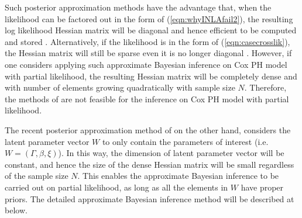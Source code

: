\documentclass[ba]{imsart}
\begin{document}
Such posterior approximation methods have the advantage that, when the likelihood can be factored out in the form of (\ref{eqn:whyINLAfail2}), the resulting log likelihood Hessian matrix will be diagonal and hence efficient to be computed and stored \citep{inla}. Alternatively, if the likelihood is in the form of (\ref{eqn:casecrosslik}), the Hessian matrix will still be sparse even it is no longer diagonal \citep{casecross}. However, if one considers applying such approximate Bayesian inference on Cox PH model with partial likelihood, the resulting Hessian matrix will be completely dense and with number of elements growing quadratically with sample size $N$. Therefore, the methods of \cite{inla,inlacoxph,casecross} are not feasible for the inference on Cox PH model with partial likelihood. 

The recent posterior approximation method of \cite{ELGM} on the other hand, considers the latent parameter vector $W$ to only contain the parameters of interest (i.e. $W = \left(\Gamma,\beta, \xi \right)$). In this way, the dimension of latent parameter vector will be constant, and hence the size of the dense Hessian matrix will be small regardless of the sample size $N$. This enables the approximate Bayesian inference to be carried out on partial likelihood, as long as all the elements in $W$ have proper priors. The detailed approximate Bayesian inference method will be described at below.
\end{document}

